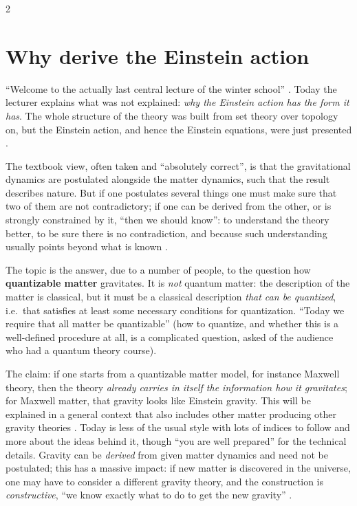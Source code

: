 \begin{paracol}{2}
\section{Why derive the Einstein action}\label{sec:c26-why}

``Welcome to the actually last central lecture of the winter school'' . Today the lecturer explains what was not explained: \emph{why the Einstein action has the form it has}. The whole structure of the theory was built from set theory over topology on, but the Einstein action, and hence the Einstein equations, were just presented .

The textbook view, often taken and ``absolutely correct'', is that the gravitational dynamics are postulated alongside the matter dynamics, such that the result describes nature. But if one postulates several things one must make sure that two of them are not contradictory; if one can be derived from the other, or is strongly constrained by it, ``then we should know'': to understand the theory better, to be sure there is no contradiction, and because such understanding usually points beyond what is known .

\begin{definition}\label{def:c26-quantizable}
The topic is the answer, due to a number of people, to the question how \textbf{quantizable matter} gravitates. It is \emph{not} quantum matter: the description of the matter is classical, but it must be a classical description \emph{that can be quantized}, i.e.\ that satisfies at least some necessary conditions for quantization. ``Today we require that all matter be quantizable'' (how to quantize, and whether this is a well-defined procedure at all, is a complicated question, asked of the audience who had a quantum theory course).
\end{definition}

The claim: if one starts from a quantizable matter model, for instance Maxwell theory, then the theory \emph{already carries in itself the information how it gravitates}; for Maxwell matter, that gravity looks like Einstein gravity. This will be explained in a general context that also includes other matter producing other gravity theories . Today is less of the usual style with lots of indices to follow and more about the ideas behind it, though ``you are well prepared'' for the technical details. Gravity can be \emph{derived} from given matter dynamics and need not be postulated; this has a massive impact: if new matter is discovered in the universe, one may have to consider a different gravity theory, and the construction is \emph{constructive}, ``we know exactly what to do to get the new gravity'' .


\end{paracol}
